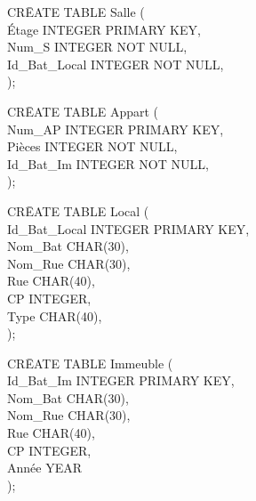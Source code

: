 \documentclass[a4paper,10.5pt]{report}
\begin{document}
		\begin{tabbing}
			CR\=EATE TABLE Salle (\\
			\> Étage INTEGER PRIMARY KEY,\\
			\> Num\_S INTEGER NOT NULL,\\
			\> Id\_Bat\_Local INTEGER NOT NULL,\\);
		\end{tabbing}

		\begin{tabbing}
			CR\=EATE TABLE Appart (\\
			\> Num\_AP INTEGER	 PRIMARY KEY,\\
			\> Pièces INTEGER NOT NULL,\\
			\> Id\_Bat\_Im INTEGER NOT NULL,\\);
		\end{tabbing}
                                                   
		\begin{tabbing}
			CR\=EATE TABLE Local (\\
			\> Id\_Bat\_Local INTEGER PRIMARY KEY,\\
			\> Nom\_Bat CHAR(30),\\
			\> Nom\_Rue CHAR(30),\\
			\> Rue CHAR(40),\\
			\> CP INTEGER,\\
			\> Type CHAR(40),\\);
		\end{tabbing}
		\begin{tabbing}
			CR\=EATE TABLE Immeuble (\\
			\> Id\_Bat\_Im INTEGER PRIMARY KEY,\\
			\> Nom\_Bat CHAR(30),\\
			\> Nom\_Rue CHAR(30),\\
			\> Rue CHAR(40),\\
			\> CP INTEGER,\\
			\> Année YEAR\\);
		\end{tabbing}
\end{document}

